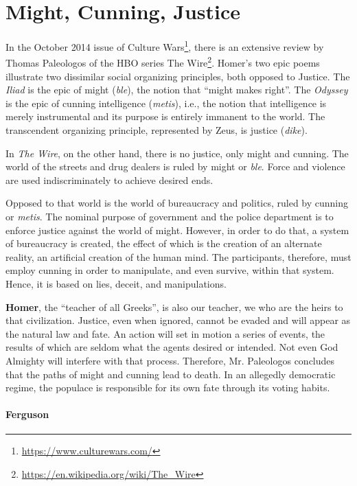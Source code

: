 \section{Might, Cunning, Justice}

In the October 2014 issue of Culture Wars\footnote{\url{https://www.culturewars.com/}}, there is an extensive review by Thomas Paleologos of the HBO series The Wire\footnote{\url{https://en.wikipedia.org/wiki/The\_Wire}}. Homer's two epic poems illustrate two dissimilar social organizing principles, both opposed to Justice. The \emph{Iliad} is the epic of might (\emph{ble}), the notion that ``might makes right''. The \emph{Odyssey} is the epic of cunning intelligence (\emph{metis}), i.e., the notion that intelligence is merely instrumental and its purpose is entirely immanent to the world. The transcendent organizing principle, represented by Zeus, is justice (\emph{dike}).

In \emph{The Wire}, on the other hand, there is no justice, only might and cunning. The world of the streets and drug dealers is ruled by might or \emph{ble}. Force and violence are used indiscriminately to achieve desired ends.

Opposed to that world is the world of bureaucracy and politics, ruled by cunning or \emph{metis}. The nominal purpose of government and the police department is to enforce justice against the world of might. However, in order to do that, a system of bureaucracy is created, the effect of which is the creation of an alternate reality, an artificial creation of the human mind. The participants, therefore, must employ cunning in order to manipulate, and even survive, within that system. Hence, it is based on lies, deceit, and manipulations.

\textbf{Homer}, the ``teacher of all Greeks'', is also our teacher, we who are the heirs to that civilization. Justice, even when ignored, cannot be evaded and will appear as the natural law and fate. An action will set in motion a series of events, the results of which are seldom what the agents desired or intended. Not even God Almighty will interfere with that process. Therefore, Mr. Paleologos concludes that the paths of might and cunning lead to death. In an allegedly democratic regime, the populace is responsible for its own fate through its voting habits.

\paragraph{Ferguson}


